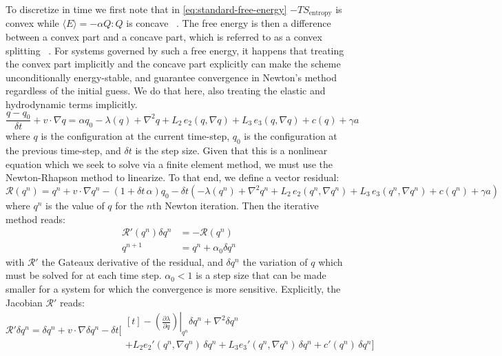 \documentclass[reqno]{article}
\begin{document}
  To discretize in time we first note that in \eqref{eq:standard-free-energy}
  $-TS_\text{entropy}$ is convex while $\langle E \rangle = -\alpha Q:Q$ is
  concave ~\cite{schimming_numerical_2021}.
  The free energy is then a difference between a convex part and a concave part,
  which is referred to as a convex splitting ~\cite{xu_stability_2019}.
  For systems governed by such a free energy, it happens that treating the
  convex part implicitly and the concave part explicitly can make the scheme
  unconditionally energy-stable, and guarantee convergence in Newton's method
  regardless of the initial guess.
  We do that here, also treating the elastic and hydrodynamic terms implicitly.
  \begin{equation}
    \frac{q - q_0}{\delta t}
    + v \cdot \nabla q
    =
    \alpha q_0
    - \lambda(q)
    + \nabla^2 q
    + L_2 \, e_2(q, \nabla q)
    + L_3 \, e_3(q, \nabla q)
    + c(q)
    + \gamma a
  \end{equation}
  where $q$ is the configuration at the current time-step, $q_0$ is the
  configuration at the previous time-step, and $\delta t$ is the step size.
  Given that this is a nonlinear equation which we seek to solve via a finite
  element method, we must use the Newton-Rhapson method to linearize.
  To that end, we define a vector residual:
  \begin{equation}
    \mathcal{R}(q^n)
    =
    q^n + v \cdot \nabla q^n
    - (1 + \delta t \, \alpha) q_0
    - 
    \delta t \left(
      -\lambda(q^n)
      + \nabla^2 q^n
      + L_2 \, e_2(q^n, \nabla q^n)
      + L_3 \, e_3(q^n, \nabla q^n)
      + c(q^n)
      + \gamma a
    \right)
  \end{equation}
  where $q^n$ is the value of $q$ for the $n$th Newton iteration.
  Then the iterative method reads:
  \begin{equation}
    \begin{split}
      \mathcal{R}'(q^n) \delta q^n &= -\mathcal{R}(q^n) \\
      q^{n + 1} &= q^n + \alpha_0 \delta q^n
    \end{split}
  \end{equation}
  with $\mathcal{R}'$ the Gateaux derivative of the residual, and $\delta q^n$
  the variation of $q$ which must be solved for at each time step.
  $\alpha_0 < 1$ is a step size that can be made smaller for a system for which
  the convergence is more sensitive.
  Explicitly, the Jacobian $\mathcal{R}'$ reads:
  \begin{equation}
    \mathcal{R}' \delta q^n
    =
      \delta q^n
      + v \cdot \nabla \delta q^n
      -\delta t \biggl[
      \begin{multlined}[t]
        - \left. \left( \frac{\partial \lambda}{\partial q} \right) \right|_{q^n} \delta q^n
        + \nabla^2 \delta q^n \\
        + L_2 e_2'(q^n, \nabla q^n) \, \delta q^n
        + L_3 e_3'(q^n, \nabla q^n) \, \delta q^n
        + c'(q^n) \, \delta q^n
      \biggr]
    \end{multlined}
  \end{equation}
\end{document}
